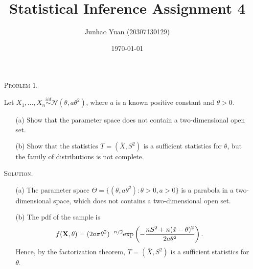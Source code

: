 \documentclass{article}
\title{\textbf{Statistical Inference Assignment 4}}
\author{Junhao Yuan (20307130129)}
\date{\today}
\begin{document}
\begin{CJK}{UTF8}{gbsn}

    \maketitle
    \def \RR{{\mathbb R}}
    \def \EE{{\mathbb E}}
    \def \VV{{\mathbb V}}
    \def \II{{\mathbb I}}
    \def \NN{{\mathcal N}}


    \begin{shaded}
        \noindent\textsc{Problem 1.}\par
        Let $X_1,\ldots, X_n \mathop{\sim}\limits^{iid} \NN (\theta, a \theta^2)$, where $a$ is
        a known positive constant and $\theta > 0$.
        \begin{itemize}
            \item [(a)] Show that the parameter space does not contain a two-dimensional open set.
            \item [(b)] Show that the statistics $T = (\bar{X}, S^2)$ is a sufficient statistics for $\theta$,
                  but the family of distributions is not complete.
        \end{itemize}
    \end{shaded}
    \noindent\textsc{Solution.}\par
    \begin{itemize}
        \item [(a)] The parameter space $\Theta = \{(\theta, a\theta^2): \theta > 0, a >0  \} $ is a parabola in a two-dimensional space,
              which does not contains a two-dimensional open set.
        \item [(b)] The pdf of the sample is
              \begin{align}
                  f(\mathbf{X}, \theta) & = (2a\pi \theta^2) ^{-n/2} \textnormal{exp} \left (-\frac{nS^2 + n(\bar{x} - \theta)^2}{2a\theta^2}  \right ).\notag
              \end{align}
              Hence, by the factorization theorem, $T = (\bar{X}, S^2)$ is a sufficient statistics for $\theta$.


\end{itemize}
\end{CJK}
\end{document}
